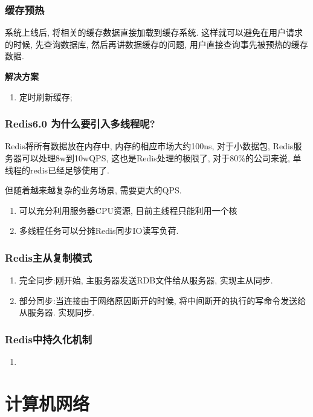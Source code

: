 \documentclass[UTF8]{ctexart}
\begin{document}
\subsubsection{缓存预热}
系统上线后, 将相关的缓存数据直接加载到缓存系统. 这样就可以避免在用户请求的时候, 先查询数据库, 然后再讲数据缓存的问题, 用户直接查询事先被预热的缓存数据.
\par
\textbf{解决方案}
\begin{enumerate}
	\item 定时刷新缓存;	
\end{enumerate}
\subsubsection{Redis6.0 为什么要引入多线程呢?}
Redis将所有数据放在内存中, 内存的相应市场大约100ns, 对于小数据包, Redis服务器可以处理8w到10wQPS, 这也是Redis处理的极限了, 对于80\%的公司来说, 单线程的redis已经足够使用了. 
\par
但随着越来越复杂的业务场景, 需要更大的QPS.
\begin{enumerate}
	\item 可以充分利用服务器CPU资源, 目前主线程只能利用一个核
	\item 多线程任务可以分摊Redis同步IO读写负荷.	
\end{enumerate}
\subsubsection{Redis主从复制模式}
\begin{enumerate}
	\item 完全同步:刚开始, 主服务器发送RDB文件给从服务器, 实现主从同步.
	\item 部分同步:当连接由于网络原因断开的时候, 将中间断开的执行的写命令发送给从服务器. 实现同步.	
\end{enumerate}
\subsubsection{Redis中持久化机制}
\begin{enumerate}
	\item 
\end{enumerate}


\section{计算机网络}
\end{document}
